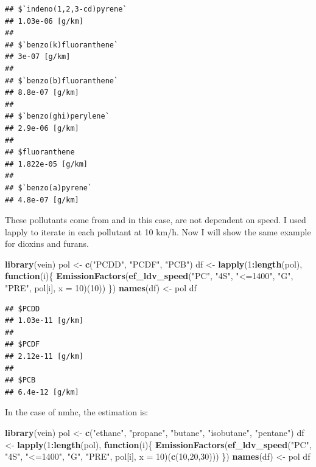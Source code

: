 \documentclass[12pt,graybox,envcountchap,sectrefs]{krantz}
\makeatletter
\newenvironment{Shaded}{\begin{snugshade}}{\end{snugshade}}
\newcommand{\KeywordTok}[1]{\textcolor[rgb]{0.13,0.29,0.53}{\textbf{#1}}}
\newcommand{\DataTypeTok}[1]{\textcolor[rgb]{0.13,0.29,0.53}{#1}}
\newcommand{\DecValTok}[1]{\textcolor[rgb]{0.00,0.00,0.81}{#1}}
\newcommand{\StringTok}[1]{\textcolor[rgb]{0.31,0.60,0.02}{#1}}
\newcommand{\ControlFlowTok}[1]{\textcolor[rgb]{0.13,0.29,0.53}{\textbf{#1}}}
\newcommand{\OperatorTok}[1]{\textcolor[rgb]{0.81,0.36,0.00}{\textbf{#1}}}
\newcommand{\NormalTok}[1]{#1}
\newenvironment{kframe}{%
\medskip{}
\setlength{\fboxsep}{.8em}
 \def\at@end@of@kframe{}%
 \ifinner\ifhmode%
  \def\at@end@of@kframe{\end{minipage}}%
  \begin{minipage}{\columnwidth}%
 \fi\fi%
 \def\FrameCommand##1{\hskip\@totalleftmargin \hskip-\fboxsep
 \colorbox{shadecolor}{##1}\hskip-\fboxsep
     \hskip-\linewidth \hskip-\@totalleftmargin \hskip\columnwidth}%
 \MakeFramed {\advance\hsize-\width
   \@totalleftmargin\z@ \linewidth\hsize
   \@setminipage}}%
 {\par\unskip\endMakeFramed%
 \at@end@of@kframe}
\renewenvironment{Shaded}{\begin{kframe}}{\end{kframe}}
\theoremstyle{definition}
\theoremstyle{definition}
\theoremstyle{definition}
\theoremstyle{remark}
\makeatother
\begin{document}
\begin{verbatim}
## $`indeno(1,2,3-cd)pyrene`
## 1.03e-06 [g/km]
## 
## $`benzo(k)fluoranthene`
## 3e-07 [g/km]
## 
## $`benzo(b)fluoranthene`
## 8.8e-07 [g/km]
## 
## $`benzo(ghi)perylene`
## 2.9e-06 [g/km]
## 
## $fluoranthene
## 1.822e-05 [g/km]
## 
## $`benzo(a)pyrene`
## 4.8e-07 [g/km]
\end{verbatim}

These pollutants come from \citet{NtziachristosSamaras2016} and in this
case, are not dependent on speed. I used lapply to iterate in each
pollutant at 10 km/h. Now I will show the same example for dioxins and
furans.

\begin{Shaded}
\begin{Highlighting}[]
\KeywordTok{library}\NormalTok{(vein)}
\NormalTok{pol <-}\StringTok{ }\KeywordTok{c}\NormalTok{(}\StringTok{"PCDD"}\NormalTok{, }\StringTok{"PCDF"}\NormalTok{, }\StringTok{"PCB"}\NormalTok{)}
\NormalTok{df <-}\StringTok{ }\KeywordTok{lapply}\NormalTok{(}\DecValTok{1}\OperatorTok{:}\KeywordTok{length}\NormalTok{(pol), }\ControlFlowTok{function}\NormalTok{(i)\{}
  \KeywordTok{EmissionFactors}\NormalTok{(}\KeywordTok{ef_ldv_speed}\NormalTok{(}\StringTok{"PC"}\NormalTok{, }\StringTok{"4S"}\NormalTok{, }\StringTok{"<=1400"}\NormalTok{, }\StringTok{"G"}\NormalTok{, }\StringTok{"PRE"}\NormalTok{,}
\NormalTok{                               pol[i], }\DataTypeTok{x =} \DecValTok{10}\NormalTok{)(}\DecValTok{10}\NormalTok{))}
\NormalTok{\})}
\KeywordTok{names}\NormalTok{(df) <-}\StringTok{ }\NormalTok{pol}
\NormalTok{df}
\end{Highlighting}
\end{Shaded}

\begin{verbatim}
## $PCDD
## 1.03e-11 [g/km]
## 
## $PCDF
## 2.12e-11 [g/km]
## 
## $PCB
## 6.4e-12 [g/km]
\end{verbatim}

In the case of nmhc, the estimation is:

\begin{Shaded}
\begin{Highlighting}[]
\KeywordTok{library}\NormalTok{(vein)}
\NormalTok{pol <-}\StringTok{ }\KeywordTok{c}\NormalTok{(}\StringTok{"ethane"}\NormalTok{, }\StringTok{"propane"}\NormalTok{, }\StringTok{"butane"}\NormalTok{, }\StringTok{"isobutane"}\NormalTok{, }\StringTok{"pentane"}\NormalTok{)}
\NormalTok{df <-}\StringTok{ }\KeywordTok{lapply}\NormalTok{(}\DecValTok{1}\OperatorTok{:}\KeywordTok{length}\NormalTok{(pol), }\ControlFlowTok{function}\NormalTok{(i)\{}
  \KeywordTok{EmissionFactors}\NormalTok{(}\KeywordTok{ef_ldv_speed}\NormalTok{(}\StringTok{"PC"}\NormalTok{, }\StringTok{"4S"}\NormalTok{, }\StringTok{"<=1400"}\NormalTok{, }\StringTok{"G"}\NormalTok{, }\StringTok{"PRE"}\NormalTok{,}
\NormalTok{                               pol[i], }\DataTypeTok{x =} \DecValTok{10}\NormalTok{)(}\KeywordTok{c}\NormalTok{(}\DecValTok{10}\NormalTok{,}\DecValTok{20}\NormalTok{,}\DecValTok{30}\NormalTok{)))}
\NormalTok{\})}
\KeywordTok{names}\NormalTok{(df) <-}\StringTok{ }\NormalTok{pol}
\NormalTok{df}
\end{Highlighting}
\end{Shaded}
\end{document}
